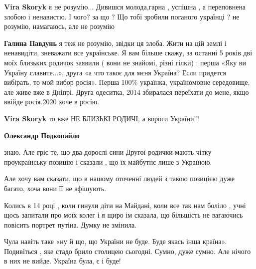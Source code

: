 \begin{itemize}
\begin{itemize}
\begin{itemize}
\textbf{Vira Skoryk} я не розумію... Дивишся молода,гарна , успішна , а
переповнена злобою і ненавистю. І чого? за що ? Що тобі зробили поганого
українці ? не розумію, намагаюсь, але не розумію

 
\textbf{Галина Павдунь} я теж не розумію, звідки ця злоба. Жити на цій землі і
ненавидіти, зневажати все українське. Я вам більше скажу, за останні 5 років
дві моїх близьких родичок заявили ( вони не знайомі, різні гілки) : перша «Яку
ви Україну славите...», друга «а что такоє для мєня Україна? Если придется
вибірать, то мой вибор росія». Перша 100\% українка, україномовне середовище,
але живе вже в Дніпрі. Друга одеситка, 2014 збиралася переїхати до мене, якщо
ввійде росія.2020 хоче в росію.

 
\textbf{Vira Skoryk} то вже НЕ БЛИЗЬКІ РОДИЧІ, а вороги України!!!

 
\textbf{Олександр Подкопайло} 

знаю. Але гріє те, що два дорослі сини Другої родички мають чітку проукраїнську
позицію і сказали , що їх майбутнє лише з Україною. 

Але хочу вам сказати, що в нашому оточенні людей з такою позицією дуже багато,
хоча вони її не афішують.

Колись в 14 році , коли гинули діти на Майдані, коли все так нам боліло , учні
щось запитали про моїх колег і я щиро ім сказала, що більшість не вагаючись
повісить портрет путіна. Думку не змінила. 

Чула навіть таке «ну й що, що України не буде. Буде якась інша країна».
Подивіться , яке стадо брило столицею сьогодні. Сумно, дуже сумно. Але нічого в
них не вийде. Україна була, є і буде!


\end{itemize}
\end{itemize}
\end{itemize}
